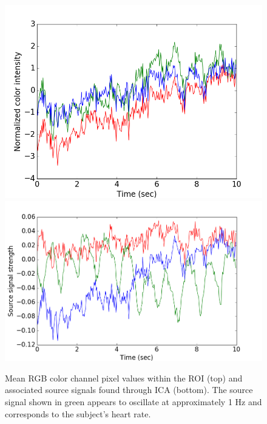 \documentclass[10pt,twocolumn,letterpaper]{article}
\begin{document}
\begin{figure}
\begin{center}
	\includegraphics[scale=0.46]{figures/RGB_signals_10sec.png}
	\includegraphics[scale=0.38]{figures/src_signals_10sec.png}
\end{center}
\caption{Mean RGB color channel pixel values within the ROI (top) and associated source signals found through ICA (bottom). The source signal shown in green appears to oscillate at approximately 1 Hz and corresponds to the subject's heart rate. }
\label{time_plots}
\end{figure}
\end{document}

